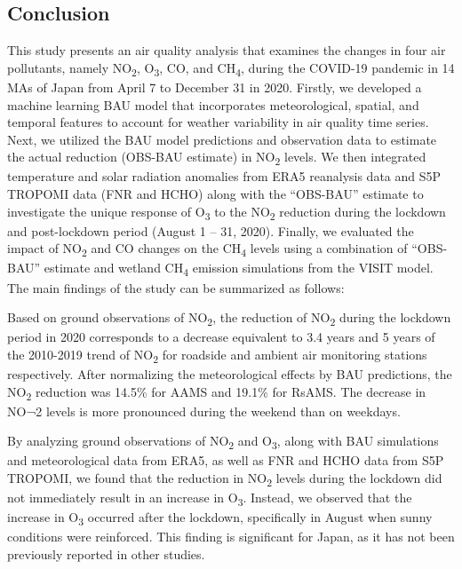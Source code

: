 \subsection{Conclusion} \label{chap4_conclusion}
This study presents an air quality analysis that examines the changes in four air pollutants, namely NO\textsubscript{2}, O\textsubscript{3}, CO, and CH\textsubscript{4}, during the COVID-19 pandemic in 14 MAs of Japan from April 7 to December 31 in 2020. Firstly, we developed a machine learning BAU model that incorporates meteorological, spatial, and temporal features to account for weather variability in air quality time series. Next, we utilized the BAU model predictions and observation data to estimate the actual reduction (OBS-BAU estimate) in NO\textsubscript{2} levels. We then integrated temperature and solar radiation anomalies from ERA5 reanalysis data and S5P TROPOMI data (FNR and HCHO) along with the “OBS-BAU” estimate to investigate the unique response of O\textsubscript{3} to the NO\textsubscript{2} reduction during the lockdown and post-lockdown period (August 1 – 31, 2020). Finally, we evaluated the impact of NO\textsubscript{2} and CO changes on the CH\textsubscript{4} levels using a combination of “OBS-BAU” estimate and wetland CH\textsubscript{4} emission simulations from the VISIT model. The main findings of the study can be summarized as follows:\par
Based on ground observations of NO\textsubscript{2}, the reduction of NO\textsubscript{2} during the lockdown period in 2020 corresponds to a decrease equivalent to 3.4 years and 5 years of the 2010-2019 trend of NO\textsubscript{2} for roadside and ambient air monitoring stations respectively. After normalizing the meteorological effects by BAU predictions, the NO\textsubscript{2} reduction was 14.5\% for AAMS and 19.1\% for RsAMS. The decrease in NO¬2 levels is more pronounced during the weekend than on weekdays.\par
By analyzing ground observations of NO\textsubscript{2} and O\textsubscript{3}, along with BAU simulations and meteorological data from ERA5, as well as FNR and HCHO data from S5P TROPOMI, we found that the reduction in NO\textsubscript{2} levels during the lockdown did not immediately result in an increase in O\textsubscript{3}. Instead, we observed that the increase in O\textsubscript{3} occurred after the lockdown, specifically in August when sunny conditions were reinforced. This finding is significant for Japan, as it has not been previously reported in other studies.\par
